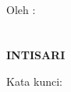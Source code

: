 \clearpage
{}
{}
\begin{center}
   \textbf{\large{\judulid}}\\[0.5cm]
   Oleh :\\
   \penulis\\
   \nim\\[2em]
    \textbf{INTISARI}\\[0.5cm]
\end{center}

\lipsum[2-4]

\noindent Kata kunci: \katakunci
